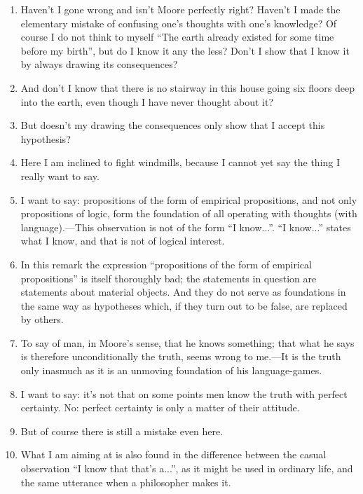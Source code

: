 \documentclass{book}
\begin{document}
\begin{enumerate}
\item
Haven't I gone wrong and isn't Moore perfectly right? Haven't I made the
elementary mistake of confusing one's thoughts with one's knowledge? Of course
I do not think to myself ``The earth already existed for some time before my
birth'', but do I know it any the less? Don't I show that I know it by always
drawing its consequences?

\item
And don't I know that there is no stairway in this house going six floors deep
into the earth, even though I have never thought about it?

\item
But doesn't my drawing the consequences only show that I accept this
hypothesis?

\item
Here I am inclined to fight windmills, because I cannot yet say the thing I
really want to say.

\item
I want to say: propositions of the form of empirical propositions, and not only
propositions of logic, form the foundation of all operating with thoughts (with
language).---This observation is not of the form ``I know...''. ``I know...''
states what I know, and that is not of logical interest.

\item
In this remark the expression ``propositions of the form of empirical
propositions'' is itself thoroughly bad; the statements in question are
statements about material objects. And they do not serve as foundations in the
same way as hypotheses which, if they turn out to be false, are replaced by
others.

\item
To say of man, in Moore's sense, that he knows something; that what he says is
therefore unconditionally the truth, seems wrong to me.---It is the truth only
inasmuch as it is an unmoving foundation of his language-games.

\item
I want to say: it's not that on some points men know the truth with perfect
certainty. No: perfect certainty is only a matter of their attitude.

\item
But of course there is still a mistake even here.

\item
What I am aiming at is also found in the difference between the casual
observation ``I know that that's a...'', as it might be used in ordinary life,
and the same utterance when a philosopher makes it.


\end{enumerate}
\end{document}
